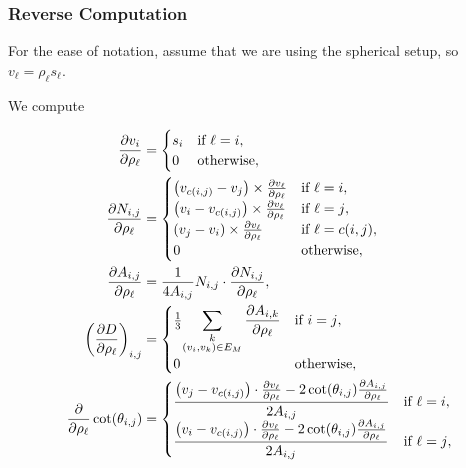 \subsubsection{Reverse Computation}

For the ease of notation, assume that we are using the spherical setup, so \(v_\ell = \rho_\ell s_\ell\).

We compute

\begin{align*}
	\frac{\partial v_i}{\partial \rho_\ell} &= \begin{cases}
		s_i & \text{if \(\ell = i\)}, \\
		0 & \text{otherwise},
	\end{cases} \\
	\frac{\partial N_{i, j}}{\partial \rho_\ell} &= \begin{cases}
		\pof{v_{c\pof{i, j}} - v_j} \times \frac{\partial v_\ell}{\partial \rho_\ell} & \text{if \(\ell = i\)}, \\
		\pof{v_i - v_{c\pof{i, j}}} \times \frac{\partial v_\ell}{\partial \rho_\ell} & \text{if \(\ell = j\)}, \\
		\pof{v_j - v_i} \times \frac{\partial v_\ell}{\partial \rho_\ell} & \text{if \(\ell = c\pof{i, j}\)}, \\
		0 & \text{otherwise},
	\end{cases} \\
	\frac{\partial A_{i, j}}{\partial \rho_\ell} &= \frac{1}{4A_{i, j}}N_{i, j} \cdot \frac{\partial N_{i, j}}{\partial \rho_\ell}, \\
	\pof{\frac{\partial D}{\partial \rho_\ell}}_{i, j} &= \begin{cases}
		\frac{1}{3}{\displaystyle\sum_{\substack{k \\ \pof{v_i, v_k} \in E_M}}\frac{\partial A_{i, k}}{\partial \rho_\ell}} & \text{if \(i = j\)}, \\
		0 & \text{otherwise},
	\end{cases} \\
	\frac{\partial}{\partial \rho_\ell}\cot\pof{\theta_{i, j}} &= \begin{cases}
		\displaystyle\frac{\pof{v_j - v_{c\pof{i, j}}} \cdot \frac{\partial v_\ell}{\partial \rho_\ell} - 2\cot\pof{\theta_{i, j}}\frac{\partial A_{i, j}}{\partial \rho_\ell}}{2A_{i, j}} & \text{if \(\ell = i\)}, \\
		\displaystyle\frac{\pof{v_i - v_{c\pof{i, j}}} \cdot \frac{\partial v_\ell}{\partial \rho_\ell} - 2\cot\pof{\theta_{i, j}}\frac{\partial A_{i, j}}{\partial \rho_\ell}}{2A_{i, j}} & \text{if \(\ell = j\)}, \\

\end{cases}
\end{align*}
